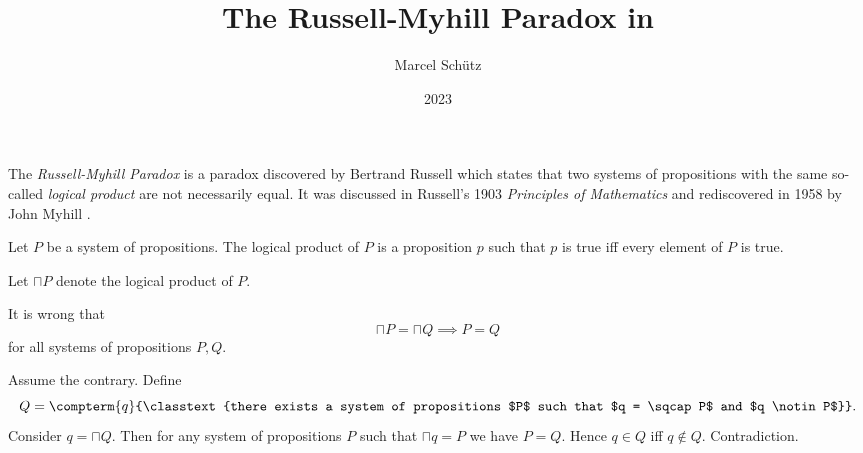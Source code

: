 \documentclass{stex}
\title{The Russell-Myhill Paradox in \Naproche}
\author{Marcel Schütz}
\date{2023}
\begin{document}
\maketitle


\noindent The \emph{Russell-Myhill Paradox} is a paradox discovered by Bertrand Russell which states that two systems of propositions with the same so-called \emph{logical product} are not necessarily equal.
It was discussed in Russell's 1903 \emph{Principles of Mathematics} \cite[Appendix B]{Russell1903} and rediscovered in 1958 by John Myhill \cite{Myhill1958}.

\begin{fsignature*}
  Let $P$ be a system of propositions.
  The logical product of $P$ is a proposition $p$ such that $p$ is true iff every element of $P$ is true.
\end{fsignature*}

Let $\sqcap P$ denote the logical product of $P$.

\begin{ftheorem*}[label=russell_myhill_paradox,title=Russell-Myhill Paradox]
  It is wrong that
  \[ \sqcap P = \sqcap Q \implies P = Q \]
  for all systems of propositions $P, Q$.
\end{ftheorem*}
\begin{fproof}
  Assume the contrary.
  Define \[Q = \compterm{q}{\classtext{there exists a system of propositions $P$ such that $q = \sqcap P$ and $q \notin P$}}.\]
  Consider $q = \sqcap Q$.
  Then for any system of propositions $P$ such that $\sqcap q = P$ we have $P = Q$.
  Hence $q \in Q$ iff $q \notin Q$.
  Contradiction.
\end{fproof}

\printbibliography
\end{document}
